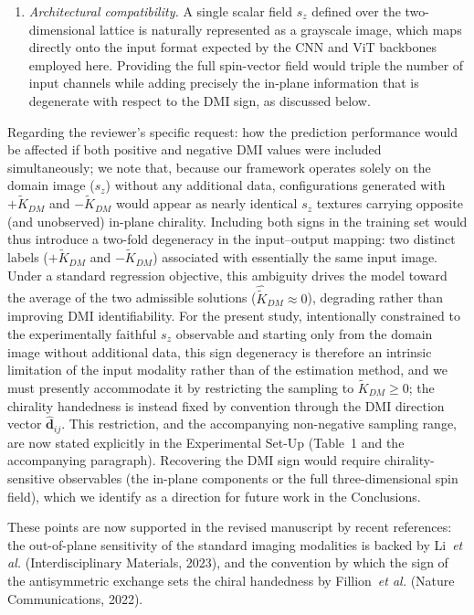 \documentclass[review,12pt]{report}
\newenvironment{reviewer}{\setcounter{pointcounter}{1}}{}
\begin{document}
\begin{reviewer}
{\begin{enumerate}
\item \textit{Architectural compatibility.} A single scalar field $s_z$ defined over the two-dimensional lattice is naturally represented as a grayscale image, which maps directly onto the input format expected by the CNN and ViT backbones employed here. Providing the full spin-vector field would triple the number of input channels while adding precisely the in-plane information that is degenerate with respect to the DMI sign, as discussed below.
\end{enumerate}

Regarding the reviewer's specific request: how the prediction performance would be affected if both positive and negative DMI values were included simultaneously; we note that, because our framework operates solely on the domain image ($s_z$) without any additional data, configurations generated with $+\tilde{K}_{DM}$ and $-\tilde{K}_{DM}$ would appear as nearly identical $s_z$ textures carrying opposite (and unobserved) in-plane chirality. Including both signs in the training set would thus introduce a two-fold degeneracy in the input--output mapping: two distinct labels ($+\tilde{K}_{DM}$ and $-\tilde{K}_{DM}$) associated with essentially the same input image. Under a standard regression objective, this ambiguity drives the model toward the average of the two admissible solutions ($\hat{\tilde{K}}_{DM}\approx 0$), degrading rather than improving DMI identifiability. For the present study, intentionally constrained to the experimentally faithful $s_z$ observable and starting only from the domain image without additional data, this sign degeneracy is therefore an intrinsic limitation of the input modality rather than of the estimation method, and we must presently accommodate it by restricting the sampling to $\tilde{K}_{DM}\geq 0$; the chirality handedness is instead fixed by convention through the DMI direction vector $\hat{\mathbf{d}}_{ij}$. This restriction, and the accompanying non-negative sampling range, are now stated explicitly in the Experimental Set-Up (Table~1 and the accompanying paragraph). Recovering the DMI sign would require chirality-sensitive observables (the in-plane components or the full three-dimensional spin field), which we identify as a direction for future work in the Conclusions.

These points are now supported in the revised manuscript by recent references: the out-of-plane sensitivity of the standard imaging modalities is backed by Li~\textit{et al.} (Interdisciplinary Materials, 2023), and the convention by which the sign of the antisymmetric exchange sets the chiral handedness by Fillion~\textit{et al.} (Nature Communications, 2022).}




\end{reviewer}
\end{document}
